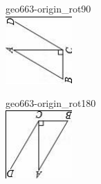 \documentclass[12pt]{article}
\begin{document}
\begin{center}
\begin{minipage}{0.32\textwidth}
\end{minipage}
\hfill\begin{minipage}{0.32\textwidth}\centering
geo663-origin\_rot90\\
\includegraphics[width=0.95\linewidth]{out_rommath_origin/items/geo663-origin/assets/figure_rot90.png}
\end{minipage}
\par\medskip
\begin{minipage}{0.32\textwidth}\centering
geo663-origin\_rot180\\
\includegraphics[width=0.95\linewidth]{out_rommath_origin/items/geo663-origin/assets/figure_rot180.png}

\end{minipage}
\end{center}
\end{document}
